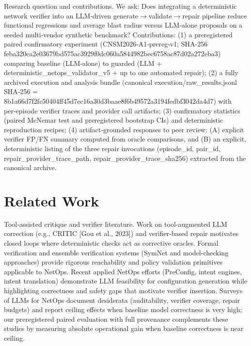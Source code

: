 \documentclass[conference]{IEEEtran}
\begin{document}
Research question and contributions. We ask: Does integrating a deterministic network verifier into an LLM‑driven generate\ensuremath{\rightarrow}validate\ensuremath{\rightarrow}repair pipeline reduce functional regressions and average blast radius versus LLM‑alone proposals on a seeded multi‑vendor synthetic benchmark? Contributions: (1) a preregistered paired confirmatory experiment (CNSM2026‑A1‑prereg‑v1; SHA‑256 feba320ea2e03679bd575ac3929f0dc060a5844982bec6758ac87d02a272eba3) comparing baseline (LLM‑alone) to guarded (LLM + deterministic\_netops\_validator\_v5 + up to one automated repair); (2) a fully archived execution and analysis bundle (canonical execution/raw\_results.jsonl SHA‑256 = 8b1a66d7f2fc50404ff45d7ec16a30d3baae8f6b49572a3194fedbf3042da4d7) with per‑episode verifier traces and provider call artifacts; (3) confirmatory statistics (paired McNemar test and preregistered bootstrap CIs) and deterministic reproduction recipes; (4) artifact‑grounded responses to peer review: (A) explicit verifier FP/FN summary computed from oracle comparisons, and (B) an explicit, deterministic listing of the three repair invocations (episode\_id, pair\_id, repair\_provider\_trace\_path, repair\_provider\_trace\_sha256) extracted from the canonical archive.

\section{Related Work}
Tool‑assisted critique and verifier literature. Work on tool‑augmented LLM correction (e.g., CRITIC [Gou et al., 2023]) and verifier‑based repair motivates closed loops where deterministic checks act as corrective oracles. Formal verification and ensemble verification systems (SymNet and model‑checking approaches) provide rigorous reachability and policy validation primitives applicable to NetOps. Recent applied NetOps efforts (PreConfig, intent engines, intent translation) demonstrate LLM feasibility for configuration generation while highlighting correctness and safety gaps that motivate verifier insertion. Surveys of LLMs for NetOps document desiderata (auditability, verifier coverage, repair budgets) and report ceiling effects when baseline model correctness is very high; our preregistered paired evaluation with full provenance complements these studies by measuring absolute operational gain when baseline correctness is near ceiling.
\end{document}
